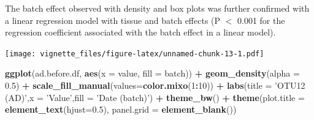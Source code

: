 \documentclass[]{book}
\newenvironment{Shaded}{\begin{snugshade}}{\end{snugshade}}
\newcommand{\KeywordTok}[1]{\textcolor[rgb]{0.13,0.29,0.53}{\textbf{#1}}}
\newcommand{\DataTypeTok}[1]{\textcolor[rgb]{0.13,0.29,0.53}{#1}}
\newcommand{\DecValTok}[1]{\textcolor[rgb]{0.00,0.00,0.81}{#1}}
\newcommand{\FloatTok}[1]{\textcolor[rgb]{0.00,0.00,0.81}{#1}}
\newcommand{\StringTok}[1]{\textcolor[rgb]{0.31,0.60,0.02}{#1}}
\newcommand{\CommentTok}[1]{\textcolor[rgb]{0.56,0.35,0.01}{\textit{#1}}}
\newcommand{\OperatorTok}[1]{\textcolor[rgb]{0.81,0.36,0.00}{\textbf{#1}}}
\newcommand{\NormalTok}[1]{#1}
\begin{document}
The batch effect observed with density and box plots was further
confirmed with a linear regression model with tissue and batch effects
(P \(<\) 0.001 for the regression coefficient associated with the batch
effect in a linear model).

\begin{Shaded}
\end{Shaded}

\texttt{[image: vignette\_files/figure-latex/unnamed-chunk-13-1.pdf]}

\begin{Shaded}
\begin{Highlighting}[]
\KeywordTok{ggplot}\NormalTok{(ad.before.df, }\KeywordTok{aes}\NormalTok{(}\DataTypeTok{x =}\NormalTok{ value, }\DataTypeTok{fill =}\NormalTok{ batch)) }\OperatorTok{+}\StringTok{ }\KeywordTok{geom_density}\NormalTok{(}\DataTypeTok{alpha =} \FloatTok{0.5}\NormalTok{) }\OperatorTok{+}\StringTok{ }\KeywordTok{scale_fill_manual}\NormalTok{(}\DataTypeTok{values=}\KeywordTok{color.mixo}\NormalTok{(}\DecValTok{1}\OperatorTok{:}\DecValTok{10}\NormalTok{)) }\OperatorTok{+}\StringTok{ }\KeywordTok{labs}\NormalTok{(}\DataTypeTok{title =} \StringTok{'OTU12 (AD)'}\NormalTok{,}\DataTypeTok{x =} \StringTok{'Value'}\NormalTok{,}\DataTypeTok{fill =} \StringTok{'Date (batch)'}\NormalTok{) }\OperatorTok{+}\StringTok{ }\KeywordTok{theme_bw}\NormalTok{() }\OperatorTok{+}\StringTok{ }\KeywordTok{theme}\NormalTok{(}\DataTypeTok{plot.title =} \KeywordTok{element_text}\NormalTok{(}\DataTypeTok{hjust=}\FloatTok{0.5}\NormalTok{), }\DataTypeTok{panel.grid =} \KeywordTok{element_blank}\NormalTok{())}
\end{Highlighting}
\end{Shaded}
\end{document}

